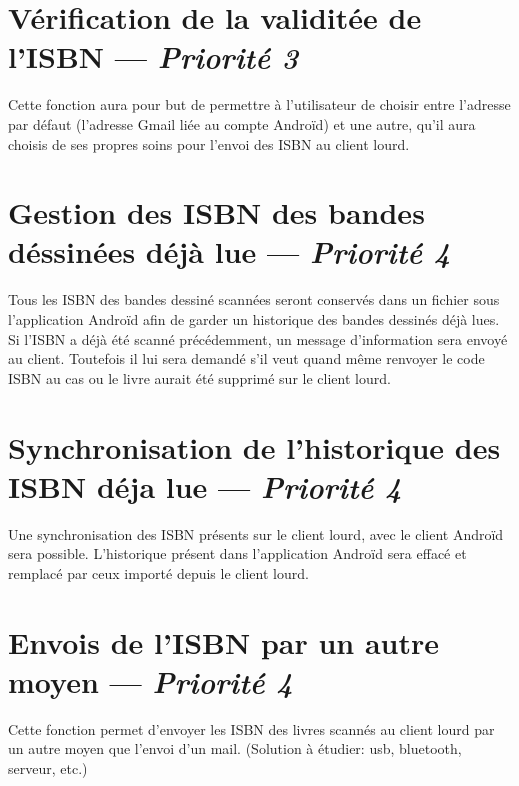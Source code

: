 \section[Envois du mail contenant l'ISBN via une autre adresse mail]{Vérification de la validitée de l'ISBN — \emph{Priorité 3}}
Cette fonction aura pour but de permettre à l'utilisateur de choisir entre l'adresse par défaut (l'adresse Gmail liée au compte Androïd) et une autre,
qu'il aura choisis de ses propres soins pour l'envoi des ISBN au client lourd. 


\section[Gestion des ISBN des bandes dessinées déjà lue]{Gestion des ISBN des bandes déssinées déjà lue — \emph{Priorité 4}}
Tous les ISBN des bandes dessiné scannées seront conservés dans un fichier sous l'application Androïd afin de garder un historique des bandes dessinés déjà lues. 
Si l'ISBN a déjà été scanné précédemment, un message d'information sera envoyé au client. 
Toutefois il lui sera demandé s'il veut quand même renvoyer le code ISBN au cas ou le livre aurait été supprimé sur le client lourd. 

\section[Synchronisation de l'historique des ISBN déja lue]{Synchronisation de l'historique des ISBN déja lue — \emph{Priorité 4}}
Une synchronisation des ISBN présents sur le client lourd, avec le client Androïd sera possible. 
L'historique présent dans l'application Androïd sera effacé et remplacé par ceux importé depuis le client lourd.

\section[Envois de l'ISBN par un autre moyen]{Envois de l'ISBN par un autre moyen — \emph{Priorité 4}}
Cette fonction permet d'envoyer les ISBN des livres scannés au client lourd par un autre moyen que l'envoi d'un mail. 
(Solution à étudier: usb, bluetooth, serveur, etc.)
